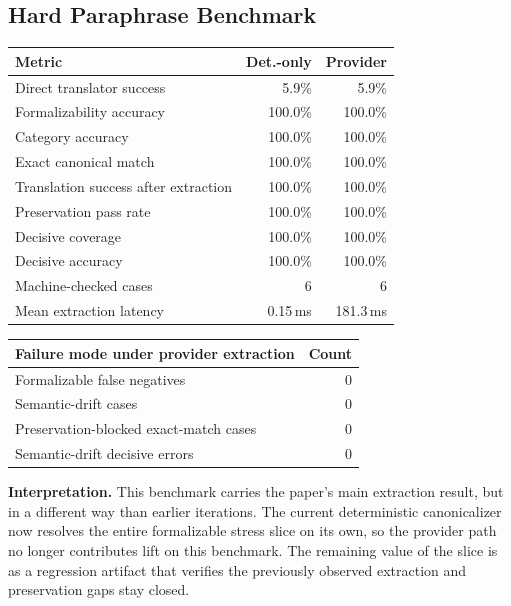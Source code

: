 \documentclass[11pt]{article}
\begin{document}
\subsection{Hard Paraphrase Benchmark}

\begin{center}
\footnotesize
\begin{tabular}{lrr}
\toprule
\textbf{Metric} & \textbf{Det.-only} & \textbf{Provider} \\
\midrule
Direct translator success & 5.9\% & 5.9\% \\
Formalizability accuracy & 100.0\% & 100.0\% \\
Category accuracy & 100.0\% & 100.0\% \\
Exact canonical match & 100.0\% & 100.0\% \\
Translation success after extraction & 100.0\% & 100.0\% \\
Preservation pass rate & 100.0\% & 100.0\% \\
Decisive coverage & 100.0\% & 100.0\% \\
Decisive accuracy & 100.0\% & 100.0\% \\
Machine-checked cases & 6 & 6 \\
Mean extraction latency & 0.15\,ms & 181.3\,ms \\
\bottomrule
\end{tabular}
\normalsize
\end{center}

\begin{center}
\footnotesize
\begin{tabular}{lr}
\toprule
\textbf{Failure mode under provider extraction} & \textbf{Count} \\
\midrule
Formalizable false negatives & 0 \\
Semantic-drift cases & 0 \\
Preservation-blocked exact-match cases & 0 \\
Semantic-drift decisive errors & 0 \\
\bottomrule
\end{tabular}
\normalsize
\end{center}

\textbf{Interpretation.} This benchmark carries the paper's main extraction
result, but in a different way than earlier iterations. The current
deterministic canonicalizer now resolves the entire formalizable stress slice
on its own, so the provider path no longer contributes lift on this benchmark.
The remaining value of the slice is as a regression artifact that verifies the
previously observed extraction and preservation gaps stay closed.
\end{document}
